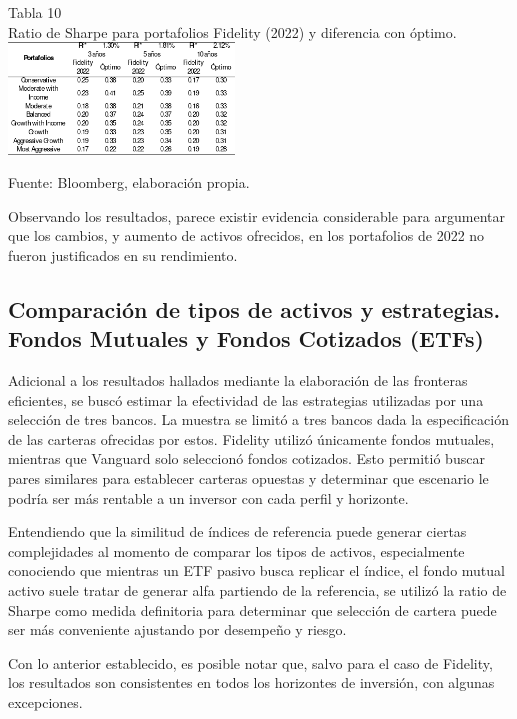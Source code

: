 \documentclass[a4paper,fleqn]{cas-sc}
\begin{document}
\begin{center}
	Tabla 10\\
	Ratio de Sharpe para portafolios Fidelity (2022) y diferencia con óptimo.\\

	\includegraphics[width=0.45\textwidth]{image/tabla10.png}

	\tiny Fuente: Bloomberg, elaboración propia.
\end{center}

Observando los resultados, parece existir evidencia considerable para argumentar que los cambios, y aumento de activos ofrecidos, en los portafolios de 2022 no fueron justificados en su rendimiento.

\subsection{Comparación de tipos de activos y estrategias. Fondos Mutuales y Fondos Cotizados (ETFs) }

Adicional a los resultados hallados mediante la elaboración de las fronteras eficientes, se buscó estimar la efectividad de las estrategias utilizadas por una selección de tres bancos. La muestra se limitó a tres bancos dada la especificación de las carteras ofrecidas por estos. Fidelity utilizó únicamente fondos mutuales, mientras que Vanguard solo seleccionó fondos cotizados. Esto permitió buscar pares similares para establecer carteras opuestas y determinar que escenario le podría ser más rentable a un inversor con cada perfil y horizonte. 

Entendiendo que la similitud de índices de referencia puede generar ciertas complejidades al momento de comparar los tipos de activos, especialmente conociendo que mientras un ETF pasivo busca replicar el índice, el fondo mutual activo suele tratar de generar alfa partiendo de la referencia, se utilizó la ratio de Sharpe como medida definitoria para determinar que selección de cartera puede ser más conveniente ajustando por desempeño y riesgo. 

 Con lo anterior establecido, es posible notar que, salvo para el caso de Fidelity, los resultados son consistentes en todos los horizontes de inversión, con algunas excepciones.
\end{document}
